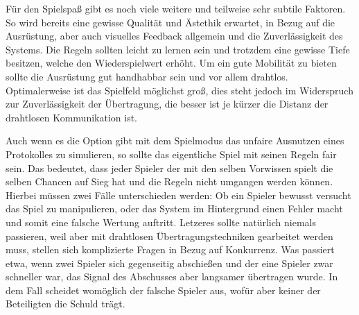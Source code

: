Für den Spielspaß gibt es noch viele weitere und teilweise sehr subtile
Faktoren. So wird bereits eine gewisse Qualität und Ästethik erwartet, in
Bezug auf die Ausrüstung, aber auch visuelles Feedback allgemein und die
Zuverlässigkeit des Systems. Die Regeln sollten leicht zu lernen sein und
trotzdem eine gewisse Tiefe besitzen, welche den Wiederspielwert erhöht.
Um ein gute Mobilität zu bieten sollte die Ausrüstung gut handhabbar sein
und vor allem drahtlos. Optimalerweise ist das Spielfeld möglichst groß, dies
steht jedoch im Widerspruch zur Zuverlässigkeit der Übertragung, die besser ist
je kürzer die Distanz der drahtlosen Kommunikation ist.

Auch wenn es die Option gibt mit dem Spielmodus das unfaire Ausnutzen eines
Protokolles zu simulieren, so sollte das eigentliche Spiel mit seinen Regeln
fair sein. Das bedeutet, dass jeder Spieler der mit den selben Vorwissen spielt
die selben Chancen auf Sieg hat und die Regeln nicht umgangen werden können.
Hierbei müssen zwei Fälle unterschieden werden: Ob ein Spieler bewusst versucht
das Spiel zu manipulieren, oder das System im Hintergrund einen Fehler macht
und somit eine falsche Wertung auftritt. Letzeres sollte natürlich niemals
passieren, weil aber mit drahtlosen Übertragungstechniken gearbeitet werden
muss, stellen sich komplizierte Fragen in Bezug auf Konkurrenz. Was passiert
etwa, wenn zwei Spieler sich gegenseitig abschießen und der eine Spieler
zwar schneller war, das Signal des Abschusses aber langsamer übertragen wurde.
In dem Fall scheidet womöglich der falsche Spieler aus, wofür aber keiner der
Beteiligten die Schuld trägt.
